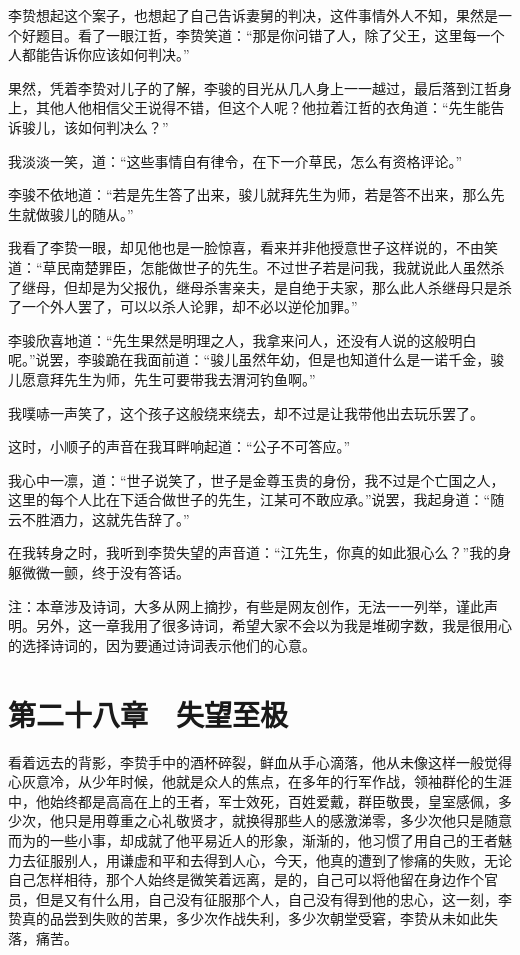 李贽想起这个案子，也想起了自己告诉妻舅的判决，这件事情外人不知，果然是一个好题目。看了一眼江哲，李贽笑道：“那是你问错了人，除了父王，这里每一个人都能告诉你应该如何判决。”

果然，凭着李贽对儿子的了解，李骏的目光从几人身上一一越过，最后落到江哲身上，其他人他相信父王说得不错，但这个人呢？他拉着江哲的衣角道：“先生能告诉骏儿，该如何判决么？”

我淡淡一笑，道：“这些事情自有律令，在下一介草民，怎么有资格评论。”

李骏不依地道：“若是先生答了出来，骏儿就拜先生为师，若是答不出来，那么先生就做骏儿的随从。”

我看了李贽一眼，却见他也是一脸惊喜，看来并非他授意世子这样说的，不由笑道：“草民南楚罪臣，怎能做世子的先生。不过世子若是问我，我就说此人虽然杀了继母，但却是为父报仇，继母杀害亲夫，是自绝于夫家，那么此人杀继母只是杀了一个外人罢了，可以以杀人论罪，却不必以逆伦加罪。”

李骏欣喜地道：“先生果然是明理之人，我拿来问人，还没有人说的这般明白呢。”说罢，李骏跪在我面前道：“骏儿虽然年幼，但是也知道什么是一诺千金，骏儿愿意拜先生为师，先生可要带我去渭河钓鱼啊。”

我噗哧一声笑了，这个孩子这般绕来绕去，却不过是让我带他出去玩乐罢了。

这时，小顺子的声音在我耳畔响起道：“公子不可答应。”

我心中一凛，道：“世子说笑了，世子是金尊玉贵的身份，我不过是个亡国之人，这里的每个人比在下适合做世子的先生，江某可不敢应承。”说罢，我起身道：“随云不胜酒力，这就先告辞了。”

在我转身之时，我听到李贽失望的声音道：“江先生，你真的如此狠心么？”我的身躯微微一颤，终于没有答话。

注：本章涉及诗词，大多从网上摘抄，有些是网友创作，无法一一列举，谨此声明。另外，这一章我用了很多诗词，希望大家不会以为我是堆砌字数，我是很用心的选择诗词的，因为要通过诗词表示他们的心意。

\chapter{第二十八章　失望至极}

看着远去的背影，李贽手中的酒杯碎裂，鲜血从手心滴落，他从未像这样一般觉得心灰意冷，从少年时候，他就是众人的焦点，在多年的行军作战，领袖群伦的生涯中，他始终都是高高在上的王者，军士效死，百姓爱戴，群臣敬畏，皇室感佩，多少次，他只是用尊重之心礼敬贤才，就换得那些人的感激涕零，多少次他只是随意而为的一些小事，却成就了他平易近人的形象，渐渐的，他习惯了用自己的王者魅力去征服别人，用谦虚和平和去得到人心，今天，他真的遭到了惨痛的失败，无论自己怎样相待，那个人始终是微笑着远离，是的，自己可以将他留在身边作个官员，但是又有什么用，自己没有征服那个人，自己没有得到他的忠心，这一刻，李贽真的品尝到失败的苦果，多少次作战失利，多少次朝堂受窘，李贽从未如此失落，痛苦。


